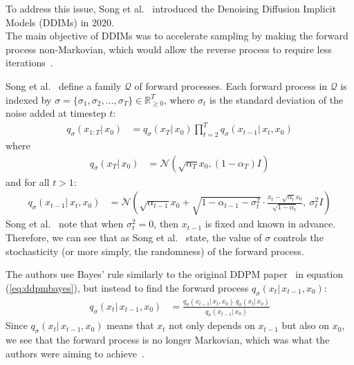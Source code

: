 \documentclass[twoside]{article}
\numberwithin{equation}{section}
\numberwithin{figure}{section}
\begin{document}
To address this issue, Song et al.~\cite{song2022denoising} introduced the Denoising Diffusion Implicit Models (DDIMs) in 2020. \\
The main objective of DDIMs was to accelerate sampling by making the forward process non-Markovian, which would allow the reverse process to require less iterations~\cite{song2022denoising}.

Song et al.~\cite{song2022denoising} define a family $\mathcal{Q}$ of forward processes. Each forward process in $\mathcal{Q}$ is indexed by $\sigma  = \{ \sigma_1, \sigma_2, \ldots, \sigma_T \} \in \mathbb{R}^T_{\geq 0}$, where $\sigma_t$ is the standard deviation of the noise added at timestep $t$:
\begin{align}
  q_{\sigma}(x_{1:T}| \, x_0) &= q_{\sigma}(x_T | \, x_0) \prod_{t=2}^{T} q_{\sigma}(x_{t-1}| \, x_t, x_0)
\end{align}
where
\begin{align}
  q_{\sigma}(x_T | \, x_0) &= \mathcal{N}(\sqrt{\alpha_T} x_0, (1 - \alpha_T) I)
\end{align}
and for all $t > 1$:
\begin{align}
  q_{\sigma}(x_{t-1} | \, x_t, x_0) &= \mathcal{N}\left( \sqrt{\alpha_{t-1}} x_0 + \sqrt{1 - \alpha_{t-1} - \sigma_t^2} \cdot \frac{x_t - \sqrt{\alpha_t} x_0}{\sqrt{1 - \alpha_t}}, \: \sigma_t^2 I \right)
\end{align}
Song et al.~\cite{song2022denoising} note that when $\sigma_t^2 = 0$, then $x_{t-1}$ is fixed and known in advance. \\
Therefore, we can see that as Song et al.~\cite{song2022denoising} state, the value of $\sigma$ controls the stochasticity (or more simply, the randomness) of the forward process.

The authors use Bayes' rule similarly to the original DDPM paper~\cite{ho2020denoising} in equation (\ref{eq:ddpmbayes}), but instead to find the forward process $q_\sigma(x_t | \, x_{t-1}, x_0)$:
\begin{align}
  q_{\sigma}(x_t | \, x_{t-1}, x_0) &= \frac{q_\sigma (x_{t-1} | \, x_t, x_0) \: q_\sigma (x_t | \, x_0)}{q_\sigma (x_{t-1} | \, x_0)}
\end{align}
Since $q_\sigma (x_t | \, x_{t-1}, x_0)$ means that $x_t$ not only depends on $x_{t-1}$ but also on $x_0$, we see that the forward process is no longer Markovian, which was what the authors were aiming to achieve~\cite{song2022denoising}.
\end{document}
